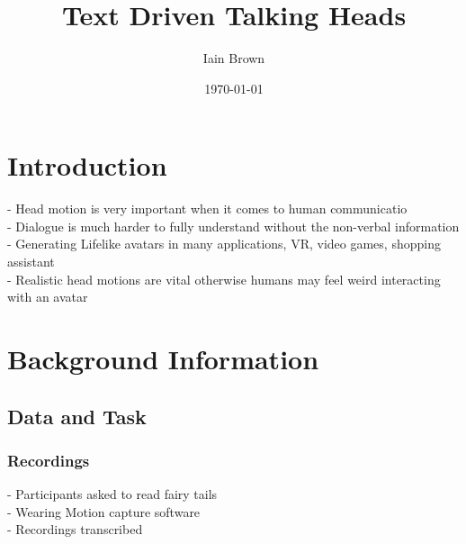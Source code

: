 \documentclass[bsc,frontabs,twoside,singlespacing,parskip]{infthesis}
\begin{document}
\title{Text Driven Talking Heads}

\author{Iain Brown}

\date{\today}
\maketitle
\tableofcontents

\chapter{Introduction}
- Head motion is very important when it comes to human communicatio\\
- Dialogue is much harder to fully understand without the non-verbal information\\
- Generating Lifelike avatars in many applications, VR, video games, shopping assistant \\
- Realistic head motions are vital otherwise humans may feel weird interacting with an avatar \\

\chapter{Background Information}
\section{Data and Task}
\subsection{Recordings}
- Participants asked to read fairy tails \\
- Wearing Motion capture software \\
- Recordings transcribed \\
\end{document}
